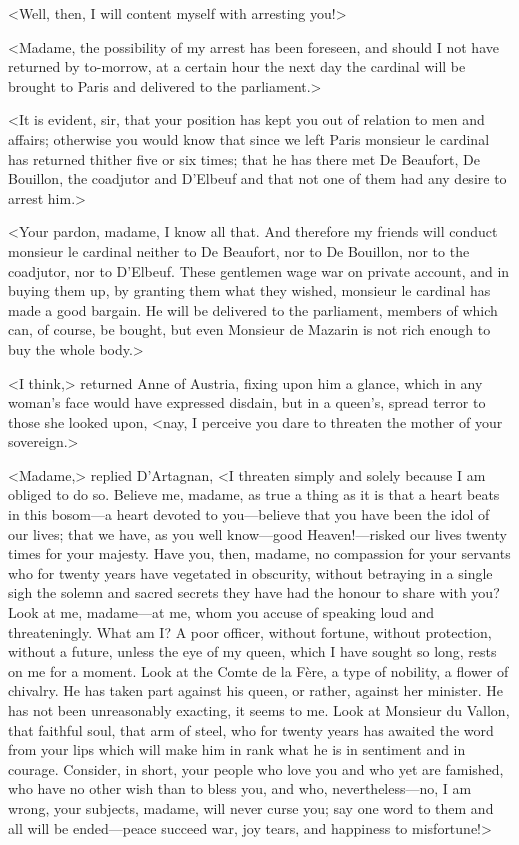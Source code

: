 <Well, then, I will content myself with arresting you!>

<Madame, the possibility of my arrest has been foreseen, and should I not have returned by to-morrow, at a certain hour the next day the cardinal will be brought to Paris and delivered to the parliament.>

<It is evident, sir, that your position has kept you out of relation to men and affairs; otherwise you would know that since we left Paris monsieur le cardinal has returned thither five or six times; that he has there met De Beaufort, De Bouillon, the coadjutor and D'Elbeuf and that not one of them had any desire to arrest him.>

<Your pardon, madame, I know all that. And therefore my friends will conduct monsieur le cardinal neither to De Beaufort, nor to De Bouillon, nor to the coadjutor, nor to D'Elbeuf. These gentlemen wage war on private account, and in buying them up, by granting them what they wished, monsieur le cardinal has made a good bargain. He will be delivered to the parliament, members of which can, of course, be bought, but even Monsieur de Mazarin is not rich enough to buy the whole body.>

<I think,> returned Anne of Austria, fixing upon him a glance, which in any woman's face would have expressed disdain, but in a queen's, spread terror to those she looked upon, <nay, I perceive you dare to threaten the mother of your sovereign.>

<Madame,> replied D'Artagnan, <I threaten simply and solely because I am obliged to do so. Believe me, madame, as true a thing as it is that a heart beats in this bosom—a heart devoted to you—believe that you have been the idol of our lives; that we have, as you well know—good Heaven!—risked our lives twenty times for your majesty. Have you, then, madame, no compassion for your servants who for twenty years have vegetated in obscurity, without betraying in a single sigh the solemn and sacred secrets they have had the honour to share with you? Look at me, madame—at me, whom you accuse of speaking loud and threateningly. What am I\@? A poor officer, without fortune, without protection, without a future, unless the eye of my queen, which I have sought so long, rests on me for a moment. Look at the Comte de la Fère, a type of nobility, a flower of chivalry. He has taken part against his queen, or rather, against her minister. He has not been unreasonably exacting, it seems to me. Look at Monsieur du Vallon, that faithful soul, that arm of steel, who for twenty years has awaited the word from your lips which will make him in rank what he is in sentiment and in courage. Consider, in short, your people who love you and who yet are famished, who have no other wish than to bless you, and who, nevertheless—no, I am wrong, your subjects, madame, will never curse you; say one word to them and all will be ended—peace succeed war, joy tears, and happiness to misfortune!>

